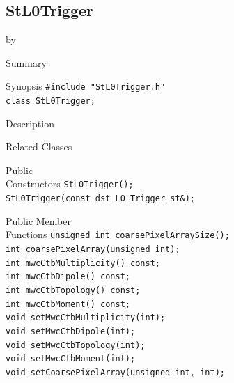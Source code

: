 \documentclass[twoside]{article}
\newcommand{\entrylabel}[1]{\mbox{\textbf{{#1}}}\hfil}%
\newenvironment{entry}
{\begin{list}{}%
    {\renewcommand{\makelabel}{\entrylabel}%
     \setlength{\labelwidth}{90pt}%
     \setlength{\leftmargin}{\labelwidth}
     \advance\leftmargin by \labelsep%
      }%
    }%
  {\end{list}}
\newcommand{\Entrylabel}[1]%
{\raisebox{0pt}[1ex][0pt]{\makebox[\labelwidth][l]%
    {\parbox[t]{\labelwidth}{\hspace{0pt}\textbf{{#1}}}}}}
\newenvironment{Entry}%
{\renewcommand{\entrylabel}{\Entrylabel}\begin{entry}}%
  {\end{entry}}
\begin{document}
\subsection{StL0Trigger}
\label{sec:StL0Trigger}
\begin{Entry}
\item[Summary]
\item[Synopsis]
    \verb+#include "StL0Trigger.h"+\\
    \verb+class StL0Trigger;+\\
\item[Description]
\item[Related Classes]
\item[Public\\ Constructors]
    \verb+StL0Trigger();+\\
    \verb+StL0Trigger(const dst_L0_Trigger_st&);+\\
\item[Public Member\\ Functions]
    \verb+unsigned int coarsePixelArraySize();+\\
    \verb+int coarsePixelArray(unsigned int);+\\
    \verb+int mwcCtbMultiplicity() const;+\\
    \verb+int mwcCtbDipole() const;+\\
    \verb+int mwcCtbTopology() const;+\\
    \verb+int mwcCtbMoment() const;+\\
    
    \verb+void setMwcCtbMultiplicity(int);+\\
    \verb+void setMwcCtbDipole(int);+\\
    \verb+void setMwcCtbTopology(int);+\\
    \verb+void setMwcCtbMoment(int);+\\
    \verb+void setCoarsePixelArray(unsigned int, int);+\\
\end{Entry}
\clearpage
\end{document}
